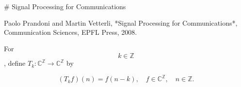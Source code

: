 # Signal Processing for Communications

Paolo Prandoni and Martin Vetterli, *Signal Processing for Communications*, Communication Sciences, EPFL Press, 2008.

For $$k \in \mathbb{Z}$$, define $T_k:\mathbb{C}^\mathbb{Z} \to \mathbb{C}^\mathbb{Z}$ by

$$
(T_k f)(n) = f(n-k), \quad f \in \mathbb{C}^\mathbb{Z}, \quad n \in \mathbb{Z}.
$$
